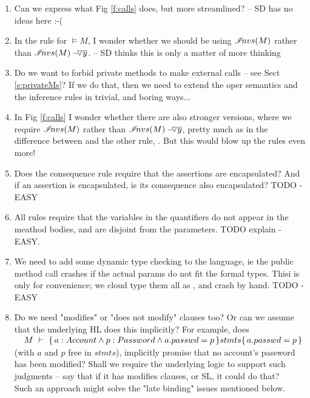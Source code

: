 {{\begin{enumerate}
\item 
Can we express what Fig \ref{f:calls} does, but more streamlined? -- SD has no ideas here  :-(
\item
In the rule for $\models M$,   I wonder whether we should be using ${\extract{M}}$ rather than $\PushAS {y} {\extract{M}}$. -- SD thinks this is only a matter of more thinking
\item
Do we want to forbid private methods to make external calls -- see Sect \ref{s:privateMs}? If we do that, then we need to extend the oper semantics and the inference rules in trivial, and boring ways...
\item
In  Fig \ref{f:calls} I wonder whether there are also stronger versions, where we require ${\extract{M}}$ rather than $\PushAS {y} {\extract{M}}$, pretty much as in the difference between {}  and the other rule, {}. But this would blow up the rules even more! 
\item
 Does the consequence rule require that the assertions are encapsulated? And if an assertion is encapsulated, is its consequence also encapsulated? TODO - EASY
\item
All rules require that the variables in the quantifiers do not appear in the meathod bodies, and are disjoint from the parameters.
TODO explain -EASY. 
\item  We need to add some dynamic type checking to the language, ie the public method call crashes if the actual params do not fit the formal types. Thisi is only for convenience; we cloud type them all as , and crash by hand. TODO - EASY
\item
Do we need "modifies" or "does not modify" clauses too? Or can we assume that the underlying HL does this implicitly? For example, does\\
$\strut \ \ \  \hproves{M}  {a:Account \wedge p:Password \wedge a.passwd=p} {stmts}  {a.passwd=p}$\\ (with $a$ and $p$  free in $stmts$),  implicitly promise that no account's password has been modified? Shall we require the underlying logic to support such judgments -- say that if it has modifies clauses, or SL, it could do that?\\
Such an approach might solve the "late binding" issues mentioned below.
\end{enumerate}
 }

}
